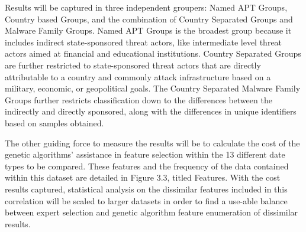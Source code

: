 \documentclass[12pt]{report}
\begin{document}

Results will be captured in three independent groupers: Named APT Groups, Country based Groups, and the combination of Country Separated Groups and Malware Family Groups.  Named APT Groups is the broadest group because it includes indirect state-sponsored threat actors, like intermediate level threat actors aimed at financial and educational institutions.  Country Separated Groups are further restricted to state-sponsored threat actors that are directly attributable to a country and commonly attack infrastructure based on a military, economic, or geopolitical goals.  The Country Separated Malware Family Groups further restricts classification down to the differences between the indirectly and directly sponsored, along with the differences in unique identifiers based on samples obtained. 

The other guiding force to measure the results will be to calculate the cost of the genetic algorithms' assistance in feature selection within the 13 different date types to be compared.  These features and the frequency of the data contained within this dataset are detailed in Figure 3.3, titled Features.  With the cost results captured, statistical analysis on the dissimilar features included in this correlation will be scaled to larger datasets in order to find a use-able balance between expert selection and genetic algorithm feature enumeration of dissimilar results.  
\end{document}

